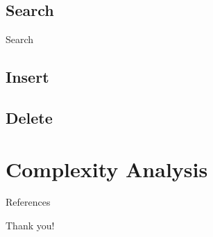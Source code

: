 \documentclass[12pt]{beamer}
\begin{document}
\subsection{Search}
\begin{frame}{Search}

\end{frame}
\subsection{Insert}
\subsection{Delete}
\section{Complexity Analysis}

\begin{frame}{References}
	
\end{frame}
\begin{frame}[standout]
Thank you! 
\end{frame}
\end{document}
